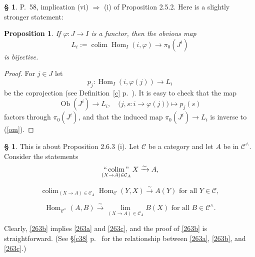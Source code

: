 \documentclass[12pt]{article}%
\newtheorem{prop}[thm]{Proposition}
\theoremstyle{remark}
\theoremstyle{definition}
\newtheorem{s}[thm]{\S}%
\newcommand{\C}{\mathcal C}
\newcommand{\then}{\Rightarrow}
\DeclareMathOperator*{\colim}{colim}
\DeclareMathOperator*{\ic}{``\colim"}
\DeclareMathOperator{\Hom}{Hom}%
\DeclareMathOperator{\Ob}{Ob}
\begin{document}
%

\begin{s} 
P.~58, implication (vi) $\then$ (i) of Proposition 2.5.2. Here is a slightly stronger statement:
%
\begin{prop} 
If $\varphi:J\to I$ is a functor, then the obvious map
\begin{equation}\label{om}
L_i:=\colim\Hom_I(i,\varphi)\to\pi_0(J^i)
\end{equation}
is bijective. 
\end{prop}
% 
\begin{proof}
For $j\in J$ let 
$$
p_j:\Hom_I(i,\varphi(j))\to L_i
$$
be the coprojection (see Definition~\ref{c} p.~\pageref{c}). It is easy to check that the map 
$$
\Ob(J^i)\to L_i,\quad\big(j,s:i\to\varphi(j)\big)\mapsto p_j(s)
$$
factors through $\pi_0(J^i)$, and that the induced map $\pi_0(J^i)\to L_i$ is inverse to (\ref{om}).
\end{proof}
\end{s}

%


\begin{s}
This is about Proposition 2.6.3 (i). Let $\C$ be a category and let $A$ be in $\C^\wedge$. Consider the statements
%
\begin{equation}\label{263a}
\ic_{(X\to A)\in\C_A}X\xrightarrow\sim A,
\end{equation} 

\begin{equation}\label{263b}
\colim_{(X\to A)\in\C_A}\Hom_\C(Y,X)\xrightarrow\sim A(Y)\text{ for all }Y\in\C, 
\end{equation}

\begin{equation}\label{263c}
\Hom_{\C^\wedge}(A,B)\xrightarrow\sim\lim_{(X\to A)\in\C_A}B(X)\text{ for all }B\in\C^\wedge. 
\end{equation}

Clearly, \eqref{263b} implies \eqref{263a} and \eqref{263c}, and the proof of \eqref{263b} is straightforward. (See \S\ref{c38} p.~\pageref{c38} for the relationship between \eqref{263a}, \eqref{263b}, and \eqref{263c}.)
\end{s}
\end{document}
